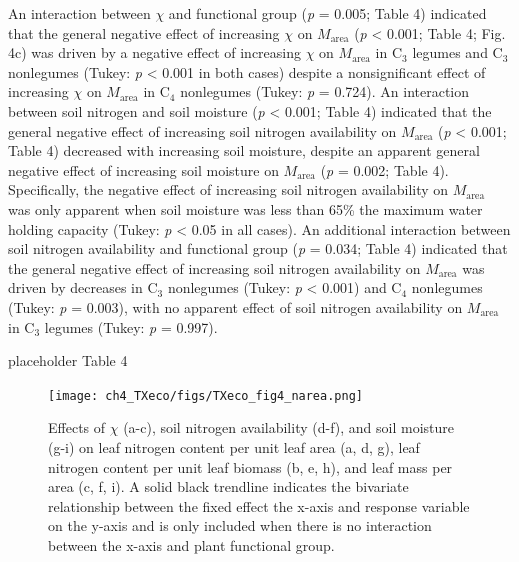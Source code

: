 An interaction between $\chi$ and functional group (\textit{p} = 0.005; Table 4) indicated that the general negative effect of increasing $\chi$ on $M_\mathrm{area}$ (\textit{p} < 0.001; Table 4; Fig. 4c) was driven by a negative effect of increasing $\chi$ on $M_\mathrm{area}$ in C$_3$ legumes and C$_3$ nonlegumes (Tukey: \textit{p} < 0.001 in both cases) despite a nonsignificant effect of increasing $\chi$ on $M_\mathrm{area}$ in C$_4$ nonlegumes (Tukey: \textit{p} = 0.724). An interaction between soil nitrogen and soil moisture (\textit{p} < 0.001; Table 4) indicated that the general negative effect of increasing soil nitrogen availability on $M_\mathrm{area}$ (\textit{p} < 0.001; Table 4) decreased with increasing soil moisture, despite an apparent general negative effect of increasing soil moisture on $M_\mathrm{area}$ (\textit{p} = 0.002; Table 4). Specifically, the negative effect of increasing soil nitrogen availability on $M_\mathrm{area}$ was only apparent when soil moisture was less than 65\% the maximum water holding capacity (Tukey: \textit{p} < 0.05 in all cases). An additional interaction between soil nitrogen availability and functional group (\textit{p} = 0.034; Table 4) indicated that the general negative effect of increasing soil nitrogen availability on $M_\mathrm{area}$ was driven by decreases in C$_3$ nonlegumes (Tukey: \textit{p} < 0.001) and C$_4$ nonlegumes (Tukey: \textit{p} = 0.003), with no apparent effect of soil nitrogen availability on $M_\mathrm{area}$ in C$_3$ legumes (Tukey: \textit{p} = 0.997).

\newpage
placeholder Table 4
\clearpage

\newpage
    \begin{figure}
        \centering
        \texttt{[image: ch4\_TXeco/figs/TXeco\_fig4\_narea.png]}
        \caption[Effects of $\chi$, soil nitrogen availability, and soil moisture on leaf nitrogen content per unit leaf area, leaf nitrogen content per unit leaf biomass, and leaf mass per area.]{Effects of $\chi$ (a-c), soil nitrogen availability (d-f), and soil moisture (g-i) on leaf nitrogen content per unit leaf area (a, d, g), leaf nitrogen content per unit leaf biomass (b, e, h), and leaf mass per area (c, f, i). A solid black trendline indicates the bivariate relationship between the fixed effect the x-axis and response variable on the y-axis and is only included when there is no interaction between the x-axis and plant functional group.}
        \label{fig:figure4.4}
    \end{figure}
\clearpage

